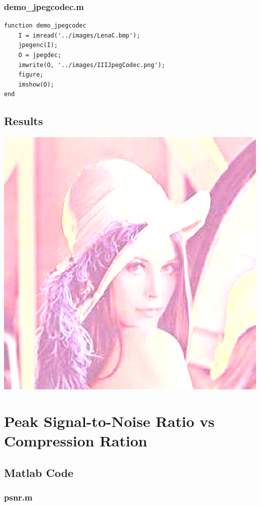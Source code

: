 \documentclass[12pt]{article}
\begin{document}
\subsubsection{demo\_jpegcodec.m}

\begin{verbatim}
function demo_jpegcodec
    I = imread('../images/LenaC.bmp');
    jpegenc(I);
    O = jpegdec;
    imwrite(O, '../images/IIIJpegCodec.png');
    figure;
    imshow(O);
end
\end{verbatim}

\subsection{Results}

\includegraphics{../images/IIIJpegCodec.eps}

\section{Peak Signal-to-Noise Ratio vs Compression Ration}

\subsection{Matlab Code}

\subsubsection{psnr.m}
\end{document}
